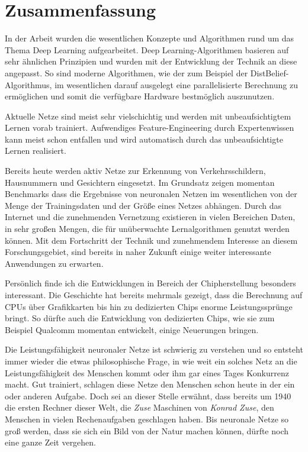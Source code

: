 \chapter{Zusammenfassung}

In der Arbeit wurden die wesentlichen Konzepte und Algorithmen rund um das Thema Deep Learning aufgearbeitet. Deep Learning-Algorithmen basieren auf sehr ähnlichen Prinzipien und wurden mit der Entwicklung der Technik an diese angepasst. So sind moderne Algorithmen, wie der zum Beispiel der DistBelief-Algorithmus, im wesentlichen darauf ausgelegt eine parallelisierte Berechnung zu ermöglichen und somit die verfügbare Hardware bestmöglich auszunutzen.

Aktuelle Netze sind meist sehr vielschichtig und werden mit unbeaufsichtigtem Lernen vorab trainiert. Aufwendiges Feature-Engineering durch Expertenwissen kann meist schon entfallen und wird automatisch durch das unbeaufsichtigte Lernen realisiert.

Bereits heute werden aktiv Netze zur Erkennung von Verkehrsschildern, Hausnummern und Gesichtern eingesetzt. Im Grundsatz zeigen momentan Benchmarks dass die Ergebnisse von neuronalen Netzen im wesentlichen von der Menge der Trainingsdaten und der Größe eines Netzes abhängen. Durch das Internet und die zunehmenden Vernetzung existieren in vielen Bereichen Daten, in sehr großen Mengen, die für unüberwachte Lernalgorithmen genutzt werden können. Mit dem Fortschritt der Technik und zunehmendem Interesse an diesem Forschungsgebiet, sind bereits in naher Zukunft einige weiter interessante Anwendungen zu erwarten.

Persönlich finde ich die Entwicklungen in Bereich der Chipherstellung besonders interessant. Die Geschichte hat bereits mehrmals gezeigt, dass die Berechnung auf CPUs über Grafikkarten bis hin zu dedizierten Chips enorme Leistungssprünge bringt. So dürfte auch die Entwicklung von dedizierten Chips, wie sie zum Beispiel Qualcomm momentan entwickelt, einige Neuerungen bringen.

Die Leistungsfähigkeit neuronaler Netze ist schwierig zu verstehen und so entsteht immer wieder die etwas philosophische Frage, in wie weit ein solches Netz an die Leistungsfähigkeit des Menschen kommt oder ihm gar eines Tages Konkurrenz macht. Gut trainiert, schlagen diese Netze den Menschen schon heute in der ein oder anderen Aufgabe. Doch sei an dieser Stelle erwähnt, dass bereits um 1940 die ersten Rechner dieser Welt, die \emph{Zuse} Maschinen von \emph{Konrad Zuse}, den Menschen in vielen Rechenaufgaben geschlagen haben. Bis neuronale Netze so groß werden, dass sie sich ein Bild von der Natur machen können, dürfte noch eine ganze Zeit vergehen.